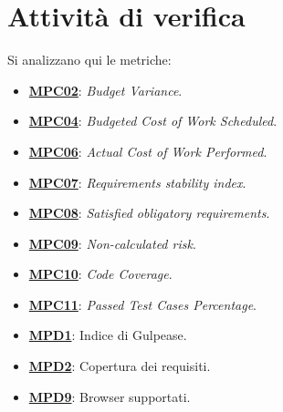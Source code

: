 \section{Attività di verifica}
Si analizzano qui le metriche:
\begin{itemize}
    \item \hyperref[s:mpc02]{\textbf{MPC02}}\textbf{}: \textit{Budget Variance}.
    \item \hyperref[s:mpc04]{\textbf{MPC04}}\textbf{}: \textit{Budgeted Cost of Work Scheduled}.
    \item \hyperref[s:mpc06]{\textbf{MPC06}}\textbf{}: \textit{Actual Cost of Work Performed}.
    \item \hyperref[s:mpc07]{\textbf{MPC07}}\textbf{}: \textit{Requirements stability index}.
    \item \hyperref[s:mpc08]{\textbf{MPC08}}\textbf{}: \textit{Satisfied obligatory requirements}.
    \item \hyperref[s:mpc09]{\textbf{MPC09}}\textbf{}: \textit{Non-calculated risk}.
    \item \hyperref[s:mpc10]{\textbf{MPC10}}\textbf{}: \textit{Code Coverage}.
    \item \hyperref[s:mpc11]{\textbf{MPC11}}\textbf{}: \textit{Passed Test Cases Percentage}.
    \item \hyperref[s:mpd1]{\textbf{MPD1}}\textbf{}: Indice di Gulpease.
    \item \hyperref[s:mpd2]{\textbf{MPD2}}\textbf{}: Copertura dei requisiti.
    \item \hyperref[s:mpd9]{\textbf{MPD9}}\textbf{}: Browser supportati.

\end{itemize}


